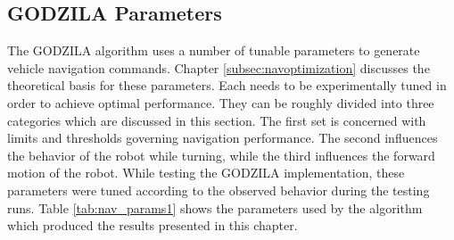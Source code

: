 


\subsection{GODZILA Parameters} \label{subsec:godzila_params}
The GODZILA algorithm uses a number of tunable parameters to generate vehicle 
navigation commands. Chapter \ref{subsec:navoptimization} discusses the theoretical
basis for these parameters. Each needs to be experimentally tuned in order
to achieve optimal performance. They can be roughly divided into three categories which
are discussed in this section. The first set is concerned with limits and thresholds
governing navigation performance. The second influences the behavior of the robot while
turning, while the third influences the forward motion of the robot.
While testing the GODZILA implementation, these parameters were tuned according to the
observed behavior during the testing runs. Table \ref{tab:nav_params1} shows the parameters used
by the algorithm which produced the results presented in this chapter.

